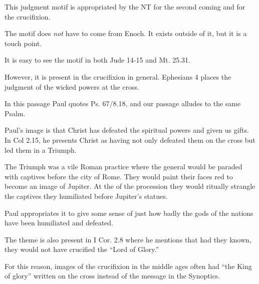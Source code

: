 \documentclass{beamer}
\begin{document}
\begin{frame}
  This judgment motif is appropriated by the NT for the second coming and for the crucifixion.
\end{frame}

\begin{frame}
  The motif does \emph{not} have to come from Enoch.
  It exists outside of it, but it is a touch point.
\end{frame}

\begin{frame}
  It is easy to see the motif in both Jude 14-15 and Mt. 25.31.
\end{frame}

\begin{frame}
  However, it is present in the crucifixion in general.
  Ephesians 4 places the judgment of the wicked powers at the cross.
\end{frame}

\begin{frame}
  In this passage Paul quotes Ps. 67/8.18, and our passage alludes to the same Psalm.
\end{frame}

\begin{frame}
  Paul's image is that Christ has defeated the spiritual powers and given us gifts.
  In Col 2.15, he presents Christ as having not only defeated them on the cross but led them in a Triumph.
\end{frame}

\begin{frame}
  The Triumph was a vile Roman practice where the general would be paraded with captives before the city of Rome.
  They would paint their faces red to become an image of Jupiter.
  At the of the procession they would ritually strangle the captives they humiliated before Jupiter's statues.
\end{frame}

\begin{frame}
  Paul appropriates it to give some sense of just how badly the gods of the nations have been humiliated and defeated.
\end{frame}

\begin{frame}
  The theme is also present in I Cor. 2.8 where he mentions that had they known, they would not have crucified the ``Lord of Glory.''
\end{frame}

\begin{frame}
  For this reason, images of the crucifixion in the middle ages often had ``the King of glory'' written on the cross instead of the message in the Synoptics.
\end{frame}
\end{document}
